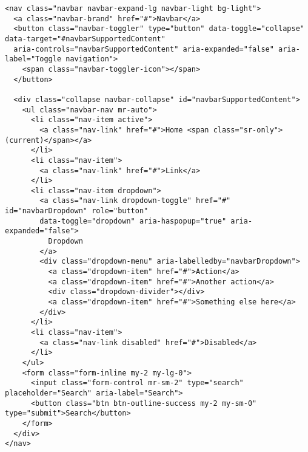 \begin{lstlisting}[frame=single, basicstyle=\tiny] 
<nav class="navbar navbar-expand-lg navbar-light bg-light">
  <a class="navbar-brand" href="#">Navbar</a>
  <button class="navbar-toggler" type="button" data-toggle="collapse" data-target="#navbarSupportedContent" 
  aria-controls="navbarSupportedContent" aria-expanded="false" aria-label="Toggle navigation">
    <span class="navbar-toggler-icon"></span>
  </button>

  <div class="collapse navbar-collapse" id="navbarSupportedContent">
    <ul class="navbar-nav mr-auto">
      <li class="nav-item active">
        <a class="nav-link" href="#">Home <span class="sr-only">(current)</span></a>
      </li>
      <li class="nav-item">
        <a class="nav-link" href="#">Link</a>
      </li>
      <li class="nav-item dropdown">
        <a class="nav-link dropdown-toggle" href="#" id="navbarDropdown" role="button" 
        data-toggle="dropdown" aria-haspopup="true" aria-expanded="false">
          Dropdown
        </a>
        <div class="dropdown-menu" aria-labelledby="navbarDropdown">
          <a class="dropdown-item" href="#">Action</a>
          <a class="dropdown-item" href="#">Another action</a>
          <div class="dropdown-divider"></div>
          <a class="dropdown-item" href="#">Something else here</a>
        </div>
      </li>
      <li class="nav-item">
        <a class="nav-link disabled" href="#">Disabled</a>
      </li>
    </ul>
    <form class="form-inline my-2 my-lg-0">
      <input class="form-control mr-sm-2" type="search" placeholder="Search" aria-label="Search">
      <button class="btn btn-outline-success my-2 my-sm-0" type="submit">Search</button>
    </form>
  </div>
</nav>
\end{lstlisting}

